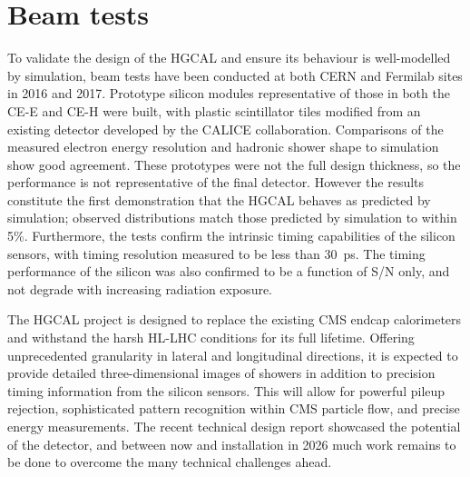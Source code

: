 \section{Beam tests}

To validate the design of the HGCAL and ensure its behaviour is well-modelled by simulation, beam tests have been conducted at both CERN and Fermilab sites in 2016 and 2017. 
Prototype silicon modules representative of those in both the CE-E and CE-H were built, with plastic scintillator tiles modified from an existing detector developed by the CALICE collaboration.
Comparisons of the measured electron energy resolution and hadronic shower shape to simulation show good agreement.
These prototypes were not the full design thickness, so the performance is not representative of the final detector.
However the results constitute the first demonstration that the HGCAL behaves as predicted by simulation; observed distributions match those predicted by simulation to within 5\%. 
Furthermore, the tests confirm the intrinsic timing capabilities of the silicon sensors, with timing resolution measured to be less than \SI{30}{\pico\second}.
The timing performance of the silicon was also confirmed to be a function of S/N only, and not degrade with increasing radiation exposure. 

The HGCAL project is designed to replace the existing CMS endcap calorimeters and withstand the harsh HL-LHC conditions for its full lifetime.
Offering unprecedented granularity in lateral and longitudinal directions, it is expected to provide detailed three-dimensional images of showers in addition to precision timing information from the silicon sensors. 
This will allow for powerful pileup rejection, sophisticated pattern recognition within CMS particle flow, and precise energy measurements. 
The recent technical design report showcased the potential of the detector, and between now and installation in 2026 much work remains to be done to overcome the many technical challenges ahead.
